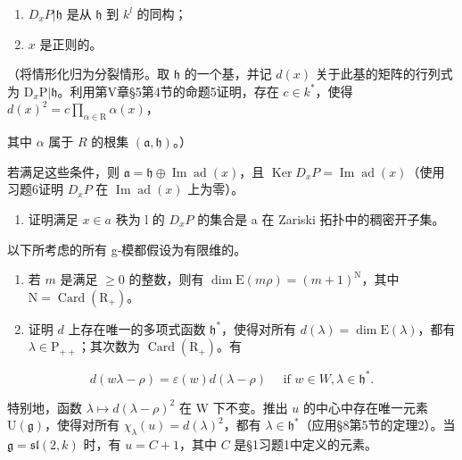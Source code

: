 \begin{enumerate}
\def\labelenumi{(\roman{enumi})}
\item
  \(D_{x}P|\mathfrak{h}\) 是从 \(\mathfrak{h}\) 到 \(k^{l}\) 的同构；
\item
  \(x\) 是正则的。
\end{enumerate}

（将情形化归为分裂情形。取 \(\mathfrak{h}\) 的一个基，并记 \(d(x)\) 关于此基的矩阵的行列式为 \(\mathrm{D}_x\mathrm{P}|\mathfrak{h}\)。利用第V章§5第4节的命题5证明，存在 \(c \in k^*\)，使得 \(d(x)^2 = c \prod_{\alpha \in \mathrm{R}} \alpha(x)\)，

其中 \(\alpha\) 属于 \(R\) 的根集 \((\mathfrak{a},\mathfrak{h})\)。）

若满足这些条件，则 \(\mathfrak{a} = \mathfrak{h} \oplus \operatorname{Im} \operatorname{ad}(x)\)，且 \(\operatorname{Ker} D_x P = \operatorname{Im} \operatorname{ad}(x)\)（使用习题6证明 \(D_x P\) 在 \(\operatorname{Im} \operatorname{ad}(x)\) 上为零）。

\begin{enumerate}
\def\labelenumi{\alph{enumi})}
\setcounter{enumi}{1}
\tightlist
\item
  证明满足 \(x \in a\) 秩为 l 的 \(D_{x}P\) 的集合是 a 在 Zariski 拓扑中的稠密开子集。
\end{enumerate}


以下所考虑的所有 g-模都假设为有限维的。

\begin{enumerate}
\def\labelenumi{\arabic{enumi})}
\item
  若 \(m\) 是满足 \(\geq 0\) 的整数，则有 \(\dim \mathrm{E}(m\rho) = (m + 1)^{\mathrm{N}}\)，其中 \(\mathrm{N} = \operatorname{Card}(\mathrm{R}_{+})\)。
\item
  证明 \(d\) 上存在唯一的多项式函数 \(\mathfrak{h}^*\)，使得对所有 \(d(\lambda) = \dim \mathrm{E}(\lambda)\)，都有 \(\lambda \in \mathrm{P}_{++}\)；其次数为 \(\operatorname{Card}(\mathrm{R}_+)\)。有
\end{enumerate}

\[
d (w \lambda - \rho) = \varepsilon (w) d (\lambda - \rho) \quad \text { if } w \in W, \lambda \in \mathfrak {h} ^ {*}.
\]

特别地，函数 \(\lambda \mapsto d(\lambda - \rho)^2\) 在 W 下不变。推出 \(u\) 的中心中存在唯一元素 \(\mathrm{U}(\mathfrak{g})\)，使得对所有 \(\chi_{\lambda}(u) = d(\lambda)^2\)，都有 \(\lambda \in \mathfrak{h}^*\)（应用§8第5节的定理2）。当 \(\mathfrak{g} = \mathfrak{sl}(2,k)\) 时，有 \(u = C + 1\)，其中 \(C\) 是§1习题1中定义的元素。

